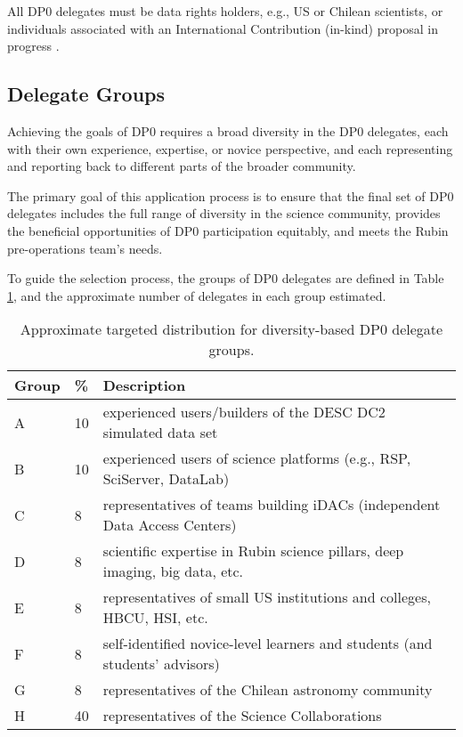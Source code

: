 \documentclass[DM,lsstdraft,authoryear,toc]{lsstdoc}
\begin{document}
All DP0 delegates must be data rights holders, e.g., US or Chilean scientists, or individuals associated with an International Contribution (in-kind) proposal in progress .

\subsection{Delegate Groups}\label{ssec:sel_grps}

Achieving the goals of DP0 requires a broad diversity in the DP0 delegates, each with their own experience, expertise, or novice perspective, and each representing and reporting back to different parts of the broader community.

The primary goal of this application process is to ensure that the final set of DP0 delegates includes the full range of diversity in the science community, provides the beneficial opportunities of DP0 participation equitably, and meets the Rubin pre-operations team's needs.

To guide the selection process, the groups of DP0 delegates are defined in Table \ref{tab:delegate_groups}, and the approximate number of delegates in each group estimated.

\begin{table}[!h]
\centering
\caption{Approximate targeted distribution for diversity-based DP0 delegate groups.}\label{tab:delegate_groups}
\begin{tabular}{lll}
\hline
Group & \% & Description \\
\hline \hline
A & 10 & experienced users/builders of the DESC DC2 simulated data set \\
B & 10 & experienced users of science platforms (e.g., RSP, SciServer, DataLab) \\
C & 8 & representatives of teams building iDACs (independent Data Access Centers) \\
D & 8 & scientific expertise in Rubin science pillars, deep imaging, big data, etc. \\
E & 8 & representatives of small US institutions and colleges, HBCU, HSI, etc. \\
F & 8 & self-identified novice-level learners and students (and students' advisors) \\
G & 8 & representatives of the Chilean astronomy community \\
H & 40 & representatives of the Science Collaborations \\
\hline
\end{tabular}
\end{table}
\end{document}
